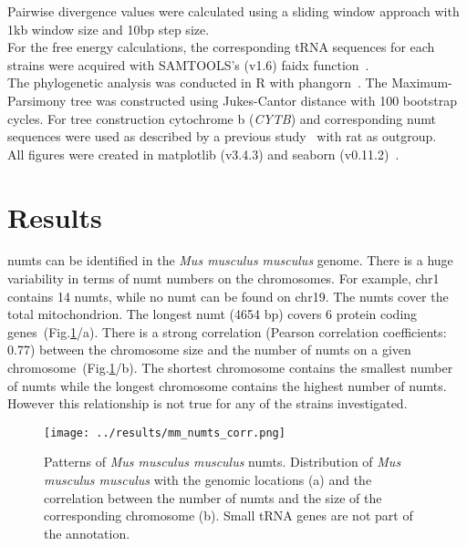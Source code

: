 \documentclass[a4paper,12pt]{article}
\numberwithin{equation}{section} %
\begin{document}
Pairwise divergence values were calculated using a sliding window approach with 1kb window size and 10bp step size.\\ \indent For the free energy calculations, the corresponding tRNA sequences for each strains were acquired with SAMTOOLS's (v1.6) faidx function~.\\ \indent The phylogenetic analysis was conducted in R with phangorn~. The Maximum-Parsimony tree was constructed using Jukes-Cantor distance with 100 bootstrap cycles. For tree construction cytochrome b (\textit{CYTB}) and corresponding numt sequences were used as described by a previous study~ with rat as outgroup.\\ \indent All figures were created in matplotlib (v3.4.3) and seaborn (v0.11.2)~.

\section{Results}
 numts can be identified in the \textit{Mus musculus musculus} genome. There is a huge variability in terms of numt numbers on the chromosomes. For example, chr1 contains 14 numts, while no numt can be found on chr19. The numts cover the total mitochondrion. The longest numt (4654 bp) covers 6 protein coding genes~(Fig.\ref{fig:mm_numts_corr}/a). There is a strong correlation (Pearson correlation coefficients: 0.77) between the chromosome size and the number of numts on a given chromosome~(Fig.\ref{fig:mm_numts_corr}/b). The shortest chromosome contains the smallest number of numts while the longest chromosome contains the highest number of numts. However this relationship is not true for any of the strains investigated.
\begin{figure}[H]
    \centering
    \captionsetup{justification=centering}
    \texttt{[image: ../results/mm\_numts\_corr.png]}
    \caption{Patterns of  \textit{Mus musculus musculus} numts. Distribution of  \textit{Mus musculus musculus} with the genomic locations (a) and the correlation between the number of numts and the size of the corresponding chromosome (b). Small tRNA genes are not part of the annotation.}
    \label{fig:mm_numts_corr}
\end{figure}
\end{document}
